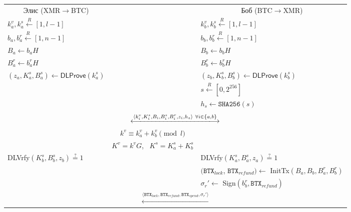 \documentclass{llncs}
\renewcommand{\arraystretch}{1.5}
\newcommand{\BTX}{\texttt{BTX}}
\newcommand{\Sign}{\textsf{Sign}}
\newcommand{\DLProve}{\textsf{DLProve}}
\newcommand{\DLVrfy}{\textsf{DLVrfy}}
\newcommand{\InitTx}{\textsf{InitTx}}
\begin{document}
\begin{figure}[H]
    \begin{table}[H]
        \centering
      {\renewcommand{\arraystretch}{1.1}%
      \begin{tabular}{ | l c l | }
        \hline
          \multicolumn{1}{|c}{Элис (XMR$\rightarrow$BTC)} &  & \multicolumn{1}{c|}{Боб (BTC$\rightarrow$XMR)} \\
          $k^v_a, k^s_a \xleftarrow{R} [1, l-1]$ & & $k^v_b, k^s_b \xleftarrow{R} [1, l-1]$ \\
          $b_a,b^r_a \xleftarrow{R} [1, n-1]$ & & $b_b,b^r_b \xleftarrow{R} [1, n-1]$ \\
          $B_a \leftarrow b_aH$ & & $B_b \leftarrow b_bH$ \\
          $B^r_a \leftarrow b^r_aH$ & & $B^r_b \leftarrow b^r_bH$ \\
          $(z_a, K^s_a, B^s_a) \leftarrow \DLProve(k^s_a)$ & & $(z_b, K^s_b, B^s_b) \leftarrow \DLProve(k^s_b)$ \\
          & & $s \xleftarrow{R} [0, 2^{256}]$ \\
          & & $h_s \gets \texttt{SHA256}(s)$ \\
           & & \\

          \multicolumn{3}{|c|}{$\xlongleftrightarrow{\langle k^v_i, K^s_i, B_i, B^s_i, B^r_i, z_i, h_s \rangle \  \forall i \in \{a, b\}}$} \\

          & $k^v \equiv k^v_a + k^v_b \pmod l$ & \\
          & $K^v = k^vG$, \ $K^s = K^s_a + K^s_b$ & \\

          \DLVrfy$(K^s_b, B^s_b, z_b) \stackrel{?}{=} 1$ & & \DLVrfy$(K^s_a, B^s_a, z_a) \stackrel{?}{=} 1$ \\
          & & $(\BTX_\textit{lock}$, $\BTX_\textit{refund}) \gets$ \InitTx$(B_a, B_b, B^r_a, B^r_b)$ \\
          & & $\sigma_r' \gets$ \Sign$(b^r_b, \BTX_\textit{refund})$ \\

          \multicolumn{3}{|c|}{$\xleftarrow{\langle \BTX_\textit{lock}, \BTX_\textit{refund}, \BTX_\textit{spend}, \sigma_r' \rangle}$} \\


\end{tabular}}
\end{table}
\end{figure}
\end{document}
